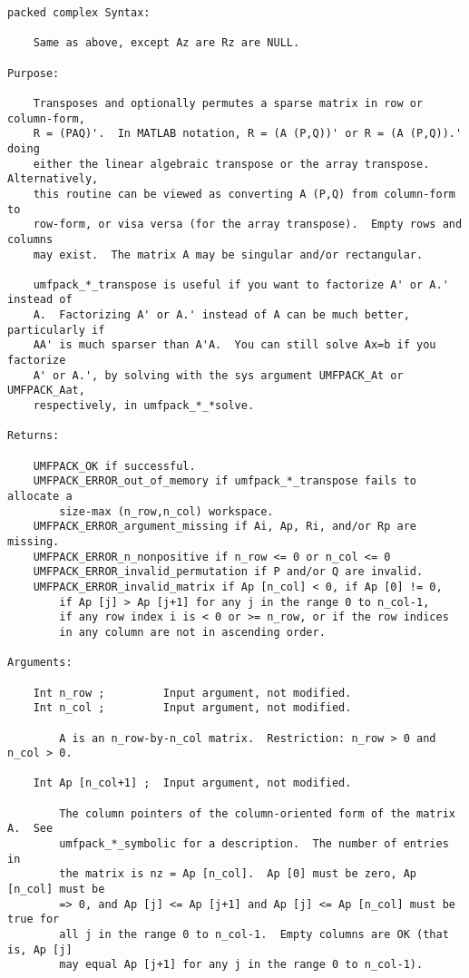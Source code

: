 \documentclass[11pt]{article}
\begin{document}
{\begin{verbatim}
packed complex Syntax:

    Same as above, except Az are Rz are NULL.

Purpose:

    Transposes and optionally permutes a sparse matrix in row or column-form,
    R = (PAQ)'.  In MATLAB notation, R = (A (P,Q))' or R = (A (P,Q)).' doing
    either the linear algebraic transpose or the array transpose. Alternatively,
    this routine can be viewed as converting A (P,Q) from column-form to
    row-form, or visa versa (for the array transpose).  Empty rows and columns
    may exist.  The matrix A may be singular and/or rectangular.

    umfpack_*_transpose is useful if you want to factorize A' or A.' instead of
    A.  Factorizing A' or A.' instead of A can be much better, particularly if
    AA' is much sparser than A'A.  You can still solve Ax=b if you factorize
    A' or A.', by solving with the sys argument UMFPACK_At or UMFPACK_Aat,
    respectively, in umfpack_*_*solve.

Returns:

    UMFPACK_OK if successful.
    UMFPACK_ERROR_out_of_memory if umfpack_*_transpose fails to allocate a
        size-max (n_row,n_col) workspace.
    UMFPACK_ERROR_argument_missing if Ai, Ap, Ri, and/or Rp are missing.
    UMFPACK_ERROR_n_nonpositive if n_row <= 0 or n_col <= 0
    UMFPACK_ERROR_invalid_permutation if P and/or Q are invalid.
    UMFPACK_ERROR_invalid_matrix if Ap [n_col] < 0, if Ap [0] != 0,
        if Ap [j] > Ap [j+1] for any j in the range 0 to n_col-1,
        if any row index i is < 0 or >= n_row, or if the row indices
        in any column are not in ascending order.

Arguments:

    Int n_row ;         Input argument, not modified.
    Int n_col ;         Input argument, not modified.

        A is an n_row-by-n_col matrix.  Restriction: n_row > 0 and n_col > 0.

    Int Ap [n_col+1] ;  Input argument, not modified.

        The column pointers of the column-oriented form of the matrix A.  See
        umfpack_*_symbolic for a description.  The number of entries in
        the matrix is nz = Ap [n_col].  Ap [0] must be zero, Ap [n_col] must be
        => 0, and Ap [j] <= Ap [j+1] and Ap [j] <= Ap [n_col] must be true for
        all j in the range 0 to n_col-1.  Empty columns are OK (that is, Ap [j]
        may equal Ap [j+1] for any j in the range 0 to n_col-1).


\end{verbatim}}
\end{document}
